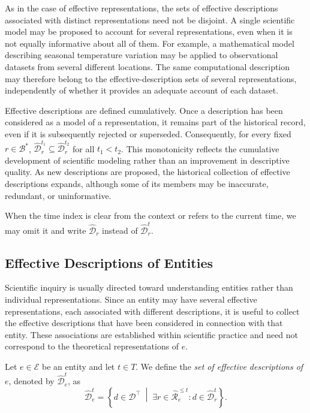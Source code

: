 As in the case of effective representations, the sets of effective descriptions associated with distinct representations need not be disjoint. A single scientific model may be proposed to account for several representations, even when it is not equally informative about all of them. For example, a mathematical model describing seasonal temperature variation may be applied to observational datasets from several different locations. The same computational description may therefore belong to the effective-description sets of several representations, independently of whether it provides an adequate account of each dataset.

Effective descriptions are defined cumulatively. Once a description has been considered as a model of a representation, it remains part of the historical record, even if it is subsequently rejected or superseded. Consequently, for every fixed $r\in\mathcal{B}^\ast$, $\hat{\mathcal{D}}_r^{t_1} \subseteq \hat{\mathcal{D}}_r^{t_2}$ for all $t_1<t_2$. This monotonicity reflects the cumulative development of scientific modeling rather than an improvement in descriptive quality. As new descriptions are proposed, the historical collection of effective descriptions expands, although some of its members may be inaccurate, redundant, or uninformative.

\begin{notation}
When the time index is clear from the context or refers to the current time, we may omit it and write $\hat{\mathcal{D}}_r$ instead of $\hat{\mathcal{D}}_r^t$.
\end{notation}


\subsection*{Effective Descriptions of Entities}

Scientific inquiry is usually directed toward understanding entities rather than individual representations. Since an entity may have several effective representations, each associated with different descriptions, it is useful to collect the effective descriptions that have been considered in connection with that entity. These associations are established within scientific practice and need not correspond to the theoretical representations of $e$.

\begin{definition}
\label{def:effective_descriptions_entity}
Let $e\in\mathcal{E}$ be an entity and let $t\in T$. We define the \emph{set of effective descriptions of $e$}, denoted by $\hat{\mathcal{D}}_e^t$, as
\[
\hat{\mathcal{D}}_e^t = \left\{ d\in\mathcal{D}^\top \;\middle|\;
\exists r\in\hat{\mathcal{R}}_e^{\leq t}: d\in\hat{\mathcal{D}}_r^t \right\}.
\]
\end{definition}

